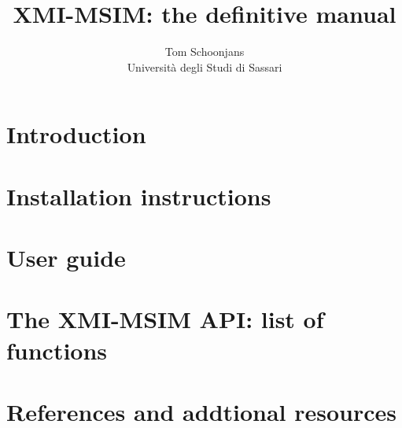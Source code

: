 \documentclass[11pt,a4paper,oneside]{article}
\title{XMI-MSIM: the definitive manual}
\author{Tom Schoonjans\\Universit\`a degli Studi di Sassari}
\begin{document}
\maketitle
\tableofcontents

\section{Introduction}


\section{Installation instructions}

\section{User guide}

\section{The XMI-MSIM API: list of functions}

\section{References and addtional resources}

\end{document}
